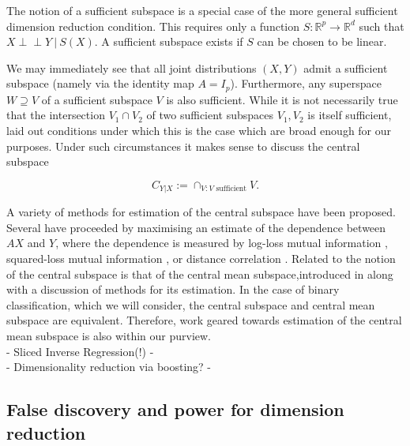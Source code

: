 \documentclass[12pt]{article}
\begin{document}
The notion of a sufficient subspace is a special case of the more general sufficient dimension reduction condition. This requires only a function $S:\mathbb{R}^p\rightarrow \mathbb{R}^d$ such that $X \perp\!\!\!\perp Y\ | \ S(X)$. A sufficient subspace exists if $S$ can be chosen to be linear. 

We may immediately see that all joint distributions $(X,Y)$ admit a sufficient subspace (namely via the identity map $A= I_p$). Furthermore, any superspace $W \supseteq V$ of a sufficient subspace $V$ is also sufficient. While it is not necessarily true that the intersection $V_1 \cap V_2$ of two sufficient subspaces $V_1,V_2$ is itself sufficient, \citet[Lemma 2]{cook_graphics_1996} laid out conditions under which this is the case which are broad enough for our purposes. Under such circumstances it makes sense to discuss the central subspace 

\begin{equation*}
    C_{Y|X} := \cap_{V: V\text{ sufficient}}V.
\end{equation*}

A variety of methods for estimation of the central subspace have been proposed. Several have proceeded by maximising an estimate of the dependence between $AX$ and $Y$, where the dependence is measured by log-loss mutual information \citep{torkkola_feature_2003, suzuki_approximating_2008}, squared-loss mutual information \citep{suzuki_sufficient_2012, yamada_sufficient_2011}, or distance correlation \citep{vepakomma_supervised_2018}. Related to the notion of the central subspace is that of the central mean subspace,introduced in \citet{cook_dimension_2002} along with a discussion of methods for its estimation. In the case of binary classification, which we will consider, the central subspace and central mean subspace are equivalent. Therefore, work geared towards estimation of the central mean subspace \citep[see for example][]{ma_estimation_2014} is also within our purview.\\

- Sliced Inverse Regression(!) -\\

- Dimensionality reduction via boosting? -\\

\subsection{False discovery and power for dimension reduction}
\citep{taeb_false_2020}
\end{document}
